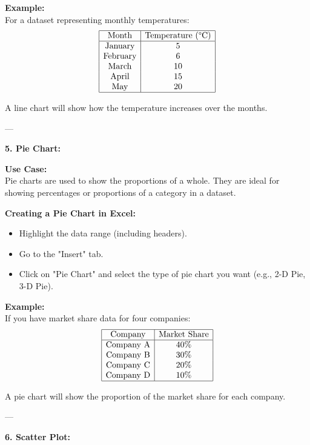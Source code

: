 \documentclass[12pt,a4paper]{book}
\begin{document}
\textbf{Example:} \\
For a dataset representing monthly temperatures:
\[
\begin{array}{|c|c|}
\hline
\text{Month} & \text{Temperature (°C)} \\
\hline
\text{January} & 5 \\
\text{February} & 6 \\
\text{March} & 10 \\
\text{April} & 15 \\
\text{May} & 20 \\
\hline
\end{array}
\]

A line chart will show how the temperature increases over the months.

---

\textbf{5. Pie Chart:}

\vspace{0.5cm}

\textbf{Use Case:} \\
Pie charts are used to show the proportions of a whole. They are ideal for showing percentages or proportions of a category in a dataset.

\textbf{Creating a Pie Chart in Excel:}
\begin{itemize}
    \item Highlight the data range (including headers).
    \item Go to the "Insert" tab.
    \item Click on "Pie Chart" and select the type of pie chart you want (e.g., 2-D Pie, 3-D Pie).
\end{itemize}

\textbf{Example:} \\
If you have market share data for four companies:
\[
\begin{array}{|c|c|}
\hline
\text{Company} & \text{Market Share} \\
\hline
\text{Company A} & 40\% \\
\text{Company B} & 30\% \\
\text{Company C} & 20\% \\
\text{Company D} & 10\% \\
\hline
\end{array}
\]

A pie chart will show the proportion of the market share for each company.

---

\textbf{6. Scatter Plot:}
\end{document}
